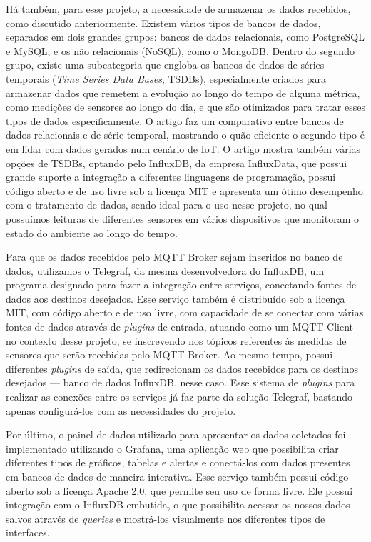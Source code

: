 \documentclass[../monografia.tex]{subfiles}
\begin{document}
Há também, para esse projeto, a necessidade de armazenar os dados recebidos, como discutido anteriormente. Existem vários tipos de bancos de dados, separados em dois grandes grupos: bancos de dados relacionais, como PostgreSQL e MySQL, e os não relacionais (NoSQL), como o MongoDB. Dentro do segundo grupo, existe uma subcategoria que engloba os bancos de dados de séries temporais (\textit{Time Series Data Bases}, TSDBs), especialmente criados para armazenar dados que remetem a evolução ao longo do tempo de alguma métrica, como medições de sensores ao longo do dia, e que são otimizados para tratar esses tipos de dados especificamente. O artigo \cite{timeseries-databases} faz um comparativo entre bancos de dados relacionais e de série temporal, mostrando o quão eficiente o segundo tipo é em lidar com dados gerados num cenário de IoT. O artigo mostra também várias opções de TSDBs, optando pelo InfluxDB, da empresa InfluxData, que possui grande suporte a integração a diferentes linguagens de programação, possui código aberto e de uso livre sob a licença MIT e apresenta um ótimo desempenho com o tratamento de dados, sendo ideal para o uso nesse projeto, no qual possuímos leituras de diferentes sensores em vários dispositivos que monitoram o estado do ambiente ao longo do tempo.

Para que os dados recebidos pelo MQTT Broker sejam inseridos no banco de dados, utilizamos o Telegraf, da mesma desenvolvedora do InfluxDB, um programa designado para fazer a integração entre serviços, conectando fontes de dados aos destinos desejados. Esse serviço também é distribuído sob a licença MIT, com código aberto e de uso livre, com capacidade de se conectar com várias fontes de dados através de \textit{plugins} de entrada, atuando como um MQTT Client no contexto desse projeto, se inscrevendo nos tópicos referentes às medidas de sensores que serão recebidas pelo MQTT Broker. Ao mesmo tempo, possui diferentes \textit{plugins} de saída, que redirecionam os dados recebidos para os destinos desejados --- banco de dados InfluxDB, nesse caso. Esse sistema de \textit{plugins} para realizar as conexões entre os serviços já faz parte da solução Telegraf, bastando apenas configurá-los com as necessidades do projeto.

Por último, o painel de dados utilizado para apresentar os dados coletados foi implementado utilizando o Grafana, uma aplicação web que possibilita criar diferentes tipos de gráficos, tabelas e alertas e conectá-los com dados presentes em bancos de dados de maneira interativa. Esse serviço também possui código aberto sob a licença Apache 2.0, que permite seu uso de forma livre. Ele possui integração com o InfluxDB embutida, o que possibilita acessar os nossos dados salvos através de \textit{queries} e mostrá-los visualmente nos diferentes tipos de interfaces.
\end{document}
